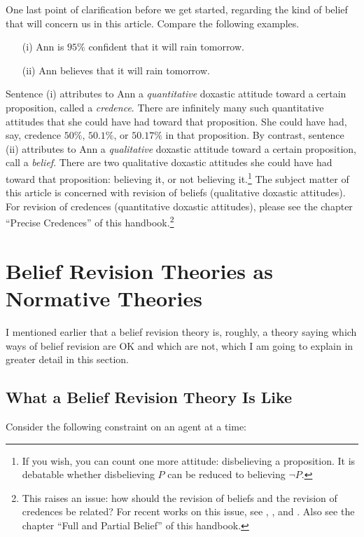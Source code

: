 One last point of clarification before we get started, regarding the kind of belief that will concern us in this article. Compare the following examples.
\begin{itemize}
	\item[(i)]  Ann is $95\%$ confident that it will rain tomorrow.
	\item[(ii)] Ann believes that it will rain tomorrow.
\end{itemize}
Sentence (i) attributes to Ann a {\em quantitative} doxastic attitude toward a certain proposition, called a {\em credence}. There are infinitely many such quantitative attitudes that she could have had toward that proposition. She could have had, say, credence $50\%$, $50.1\%$, or $50.17\%$ in that proposition. By contrast, sentence (ii) attributes to Ann a {\em qualitative} doxastic attitude toward a certain proposition, call a {\em belief}. There are two qualitative doxastic attitudes she could have had toward that proposition: believing it, or not believing it.\footnote
	{If you wish, you can count one more attitude: disbelieving a proposition. It is debatable whether disbelieving $P$ can be reduced to believing $\neg P$.} 
The subject matter of this article is concerned with revision of beliefs (qualitative doxastic attitudes). For revision of credences (quantitative doxastic attitudes), please see the chapter ``Precise Credences'' of this handbook.\footnote
	{This raises an issue: how should the revision of beliefs and the revision of credences be related? For recent works on this issue, see \citet*{arlo2012belief}, \citet*{lin2012propositional}, and \citet{leitgeb2014stability}. Also see the chapter ``Full and Partial Belief'' of this handbook.} 


\section{Belief Revision Theories as Normative Theories}\label{lin-normative}

I mentioned earlier that a belief revision theory is, roughly, a theory saying which ways of belief revision are OK and which are not, which I am going to explain in greater detail in this section. 

\subsection{What a Belief Revision Theory Is Like}\label{sec-composers}

Consider the following constraint on an agent at a time: \op

